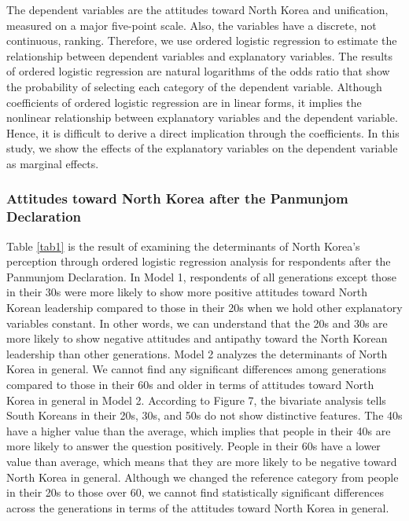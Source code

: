 \documentclass[letterpaper,9pt,twocolumn,twoside,]{pinp}
\begin{document}
The dependent variables are the attitudes toward North Korea and
unification, measured on a major five-point scale. Also, the variables
have a discrete, not continuous, ranking. Therefore, we use ordered
logistic regression to estimate the relationship between dependent
variables and explanatory variables. The results of ordered logistic
regression are natural logarithms of the odds ratio that show the
probability of selecting each category of the dependent variable.
Although coefficients of ordered logistic regression are in linear
forms, it implies the nonlinear relationship between explanatory
variables and the dependent variable. Hence, it is difficult to derive a
direct implication through the coefficients. In this study, we show the
effects of the explanatory variables on the dependent variable as
marginal effects.

\hypertarget{attitudes-toward-north-korea-after-the-panmunjom-declaration}{%
\subsubsection{Attitudes toward North Korea after the Panmunjom
Declaration}\label{attitudes-toward-north-korea-after-the-panmunjom-declaration}}

Table \ref{tab1} is the result of examining the determinants of North
Korea's perception through ordered logistic regression analysis for
respondents after the Panmunjom Declaration. In Model 1, respondents of
all generations except those in their 30s were more likely to show more
positive attitudes toward North Korean leadership compared to those in
their 20s when we hold other explanatory variables constant. In other
words, we can understand that the 20s and 30s are more likely to show
negative attitudes and antipathy toward the North Korean leadership than
other generations. Model 2 analyzes the determinants of North Korea in
general. We cannot find any significant differences among generations
compared to those in their 60s and older in terms of attitudes toward
North Korea in general in Model 2. According to Figure 7, the bivariate
analysis tells South Koreans in their 20s, 30s, and 50s do not show
distinctive features. The 40s have a higher value than the average,
which implies that people in their 40s are more likely to answer the
question positively. People in their 60s have a lower value than
average, which means that they are more likely to be negative toward
North Korea in general. Although we changed the reference category from
people in their 20s to those over 60, we cannot find statistically
significant differences across the generations in terms of the attitudes
toward North Korea in general.
\end{document}
